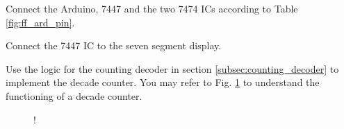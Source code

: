 \begin{problem}
Connect the Arduino, 7447 and the two 7474 ICs according to Table \ref{fig:ff_ard_pin}.
\end{problem}
%
\begin{problem}
Connect the 7447 IC to the seven segment display.
\end{problem}
\begin{problem}
Use the logic for the counting decoder in section \ref{subsec:counting_decoder} to implement the decade counter. You may refer to Fig. \ref{fig:decade_counter} to understand the
functioning of a decade counter.

\end{problem}
%
%
\begin{figure}[!h]
\begin{center}
\resizebox {\columnwidth} {!} {

}
\end{center}
\caption{}
\label{fig:decade_counter}
\end{figure}
%




